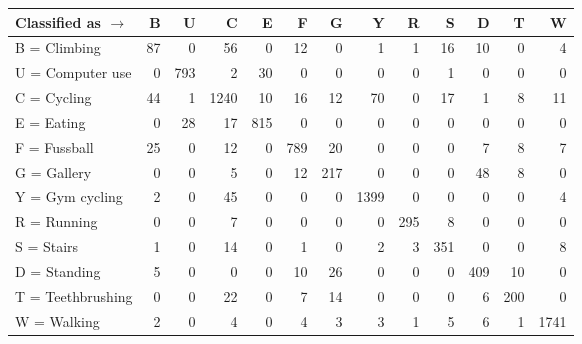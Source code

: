 \begin{tabular}{lrrrrrrrrrrrr}
\toprule
Classified as $\rightarrow$ &   B &    U &     C &    E &    F &    G &     Y &    R &    S &    D &    T &     W \\
\midrule
B = Climbing      &  87 &    0 &    56 &    0 &   12 &    0 &     1 &    1 &   16 &   10 &    0 &     4 \\
U = Computer use  &   0 &  793 &     2 &   30 &    0 &    0 &     0 &    0 &    1 &    0 &    0 &     0 \\
C = Cycling       &  44 &    1 &  1240 &   10 &   16 &   12 &    70 &    0 &   17 &    1 &    8 &    11 \\
E = Eating        &   0 &   28 &    17 &  815 &    0 &    0 &     0 &    0 &    0 &    0 &    0 &     0 \\
F = Fussball      &  25 &    0 &    12 &    0 &  789 &   20 &     0 &    0 &    0 &    7 &    8 &     7 \\
G = Gallery       &   0 &    0 &     5 &    0 &   12 &  217 &     0 &    0 &    0 &   48 &    8 &     0 \\
Y = Gym cycling   &   2 &    0 &    45 &    0 &    0 &    0 &  1399 &    0 &    0 &    0 &    0 &     4 \\
R = Running       &   0 &    0 &     7 &    0 &    0 &    0 &     0 &  295 &    8 &    0 &    0 &     0 \\
S = Stairs        &   1 &    0 &    14 &    0 &    1 &    0 &     2 &    3 &  351 &    0 &    0 &     8 \\
D = Standing      &   5 &    0 &     0 &    0 &   10 &   26 &     0 &    0 &    0 &  409 &   10 &     0 \\
T = Teethbrushing &   0 &    0 &    22 &    0 &    7 &   14 &     0 &    0 &    0 &    6 &  200 &     0 \\
W = Walking       &   2 &    0 &     4 &    0 &    4 &    3 &     3 &    1 &    5 &    6 &    1 &  1741 \\
\bottomrule
\end{tabular}
